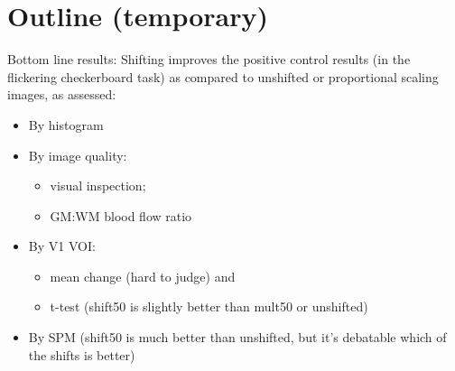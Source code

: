 \section{Outline (temporary)}
Bottom line results:  Shifting improves the positive control results (in the flickering checkerboard task) as compared to unshifted or proportional scaling images, as assessed:
\begin{itemize}
\item By histogram
\item By image quality: 
  \begin{itemize}
  \item visual inspection;
  \item GM:WM blood flow ratio
  \end{itemize}
\item By V1 VOI: 
  \begin{itemize} 
    \item mean change (hard to judge) and 
    \item t-test (shift50 is slightly better than mult50 or unshifted)
  \end{itemize}
\item By SPM (shift50 is much better than unshifted, but it's debatable which of the shifts is better)
\end{itemize}
